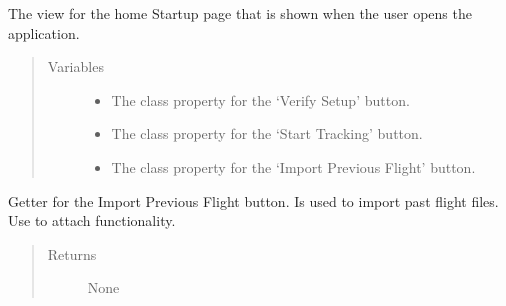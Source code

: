\documentclass[letterpaper,10pt,english]{sphinxmanual}
\begin{document}
\begin{fulllineitems}
\label{\detokenize{index:src.Views.View_StartupScreen.StartupWindow}}
The view for the home Startup page that is shown when the user opens the application.
\begin{quote}\begin{description}
\item[{Variables}] \leavevmode\begin{itemize}
\item {} 
 \textendash{} The class property for the ‘Verify Setup’ button.

\item {} 
 \textendash{} The class property for the ‘Start Tracking’ button.

\item {} 
 \textendash{} The class property for the ‘Import Previous Flight’ button.

\end{itemize}

\end{description}\end{quote}

\begin{fulllineitems}
\label{\detokenize{index:src.Views.View_StartupScreen.StartupWindow.BtnImport}}
Getter for the Import Previous Flight button. Is used to import past flight files. Use to attach functionality.
\begin{quote}\begin{description}
\item[{Returns}] \leavevmode
None

\end{description}\end{quote}

\end{fulllineitems}



\end{fulllineitems}
\end{document}
